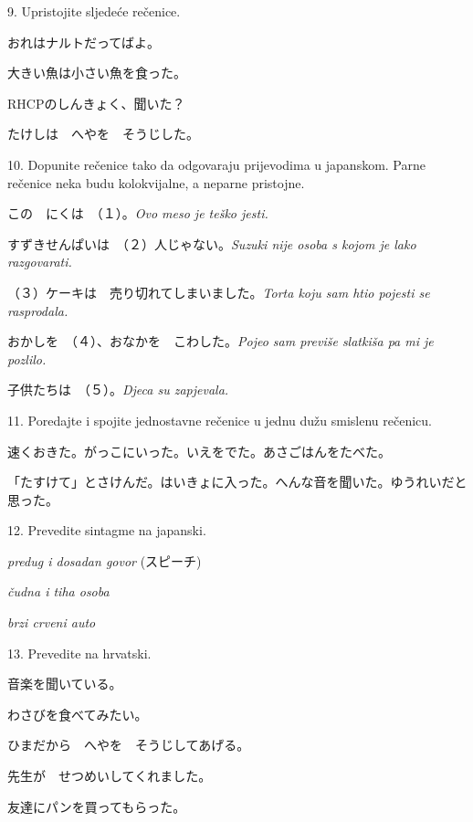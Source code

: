 	\begin{mondai}{9. Upristojite sljedeće rečenice.}
		\item おれはナルトだってばよ。
		\item 大きい魚は小さい魚を食った。
		\item RHCPのしんきょく、聞いた？
		\item たけしは　へやを　そうじした。
	\end{mondai}
	
	\begin{mondai}{10. Dopunite rečenice tako da odgovaraju prijevodima u japanskom. Parne rečenice neka budu kolokvijalne, a neparne pristojne.}
		\item この　にくは　（１）。\textit{Ovo meso je teško jesti.}
		\item すずきせんぱいは　（２）人じゃない。\textit{Suzuki nije osoba s kojom je lako razgovarati.}
		\item （３）ケーキは　売り切れてしまいました。\textit{Torta koju sam htio pojesti se rasprodala.}
		\item おかしを　（４）、おなかを　こわした。\textit{Pojeo sam previše slatkiša pa mi je pozlilo.}
		\item 子供たちは　（５）。\textit{Djeca su zapjevala.}
	\end{mondai}

	\begin{mondai}{11. Poredajte i spojite jednostavne rečenice u jednu dužu smislenu rečenicu.}
		\item 速くおきた。がっこにいった。いえをでた。あさごはんをたべた。
		\item 「たすけて」とさけんだ。はいきょに入った。へんな音を聞いた。ゆうれいだと思った。
	\end{mondai}

	\begin{mondai}{12. Prevedite sintagme na japanski.}
		\item \textit{predug i dosadan govor} (スピーチ)
		\item \textit{čudna i tiha osoba}
		\item \textit{brzi crveni auto}
	\end{mondai}

	\newpage
	\begin{mondai}{13. Prevedite na hrvatski.}
		\item 音楽を聞いている。
		\item わさびを食べてみたい。
		\item ひまだから　へやを　そうじしてあげる。
		\item 先生が　せつめいしてくれました。
		\item 友達にパンを買ってもらった。
	\end{mondai}

